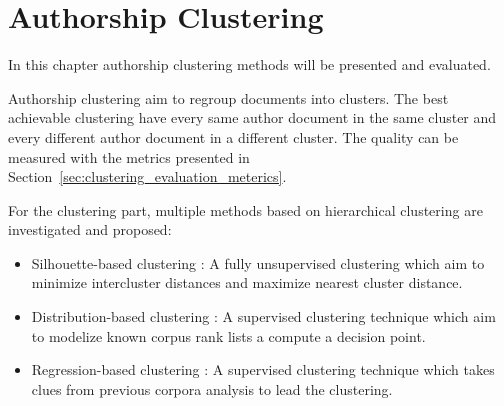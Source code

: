 \section{Authorship Clustering \label{sec:clustering}}

In this chapter authorship clustering methods will be presented and evaluated.

Authorship clustering aim to regroup documents into clusters.
The best achievable clustering have every same author document in the same cluster and every different author document in a different cluster.
The quality can be measured with the metrics presented in Section~\ref{sec:clustering_evaluation_meterics}.

For the clustering part, multiple methods based on hierarchical clustering are investigated and proposed:
\begin{itemize}
  \item
  Silhouette-based clustering : A fully unsupervised clustering which aim to minimize intercluster distances and maximize nearest cluster distance.
  \item
  Distribution-based clustering : A supervised clustering technique which aim to modelize known corpus rank lists a compute a decision point.
  \item
  Regression-based clustering : A supervised clustering technique which takes clues from previous corpora analysis to lead the clustering.
\end{itemize}






